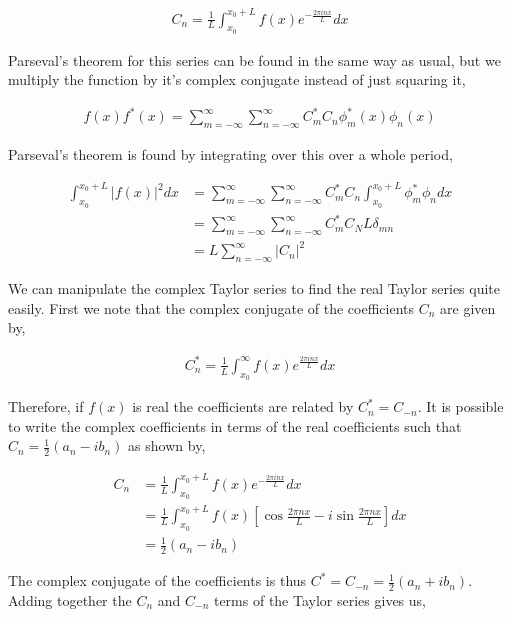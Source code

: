 \documentclass[11pt]{amsart}
\begin{document}
\begin{align*}
  C_n = \frac{1}{L}\int_{x_0}^{x_0+L}f(x)e^{-\frac{2\pi inx}{L}} dx
\end{align*}

Parseval's theorem for this series can be found in the same way as usual, but we multiply the function by it's complex conjugate instead of just squaring it,

\begin{align*}
  f(x)f^*(x) = \sum\limits_{m=-\infty}^{\infty}\sum\limits_{n=-\infty}^{\infty}C_m^*C_n\phi_m^*(x)\phi_n(x)
\end{align*}

Parseval's theorem is found by integrating over this over a whole period,

\begin{align*}
  \int_{x_0}^{x_0+L}{|f(x)|}^2 dx &= \sum\limits_{m=-\infty}^{\infty}\sum\limits_{n=-\infty}^{\infty}C_m^* C_n \int_{x_0}^{x_0+L}\phi_m^*\phi_ndx \\
                                  &= \sum\limits_{m=-\infty}^{\infty}\sum\limits_{n=-\infty}^{\infty}C_m^* C_N L \delta_{mn} \\
                                  &= L\sum\limits_{n=-\infty}^{\infty}{|C_n|}^2
\end{align*}

We can manipulate the complex Taylor series to find the real Taylor series quite easily. First we note that the complex conjugate of the coefficients $C_n$ are given by,

\begin{align*}
  C_n^* = \frac{1}{L}\int_{x_0}^{\infty}f(x)e^{\frac{2\pi inx}{L}} dx
\end{align*}

Therefore, if $f(x)$ is real the coefficients are related by $C_n^* = C_{-n}$. It is possible to write the complex coefficients in terms of the real coefficients such that $C_n = \frac{1}{2}(a_n - ib_n)$ as shown by,

\begin{align*}
  C_n &= \frac{1}{L}\int_{x_0}^{x_0+L}f(x)e^{-\frac{2\pi inx}{L}} dx \\
      &= \frac{1}{L}\int_{x_0}^{x_0+L}f(x)\left[\cos{\frac{2\pi nx}{L}}-i\sin{\frac{2\pi nx}{L}}\right] dx \\
      &= \frac{1}{2}(a_n - ib_n)
\end{align*}

The complex conjugate of the coefficients is thus $C^* = C_{-n} = \frac{1}{2}(a_n + ib_n)$. Adding together the $C_n$ and $C_{-n}$ terms of the Taylor series gives us,
\end{document}
